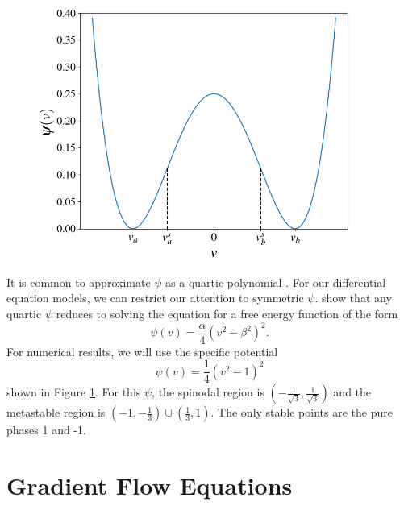 \documentclass[12pt, reqno]{report}
\theoremstyle{definition}
\theoremstyle{remark}
\begin{document}
\begin{figure}
    \centering
    \vspace{-15pt}
    \includegraphics[width=.4\paperwidth]{media_paper/our_well}
  \label{fg_double_well} 
\end{figure}
It is common to approximate $\psi$ as a quartic polynomial \cite{novickcohen_1984_nonlinear}.
For our differential equation models, we can restrict our attention to symmetric $\psi$. 
\cite{copetti_1990_kinetics} show that any quartic $\psi$ reduces to solving the equation for a free energy function of the form
\begin{equation} \label{eq_gen_psi}
    \psi(v )=\frac{\alpha}{4}(v^2-\beta^2)^2.
\end{equation}
For numerical results, we will use the specific potential
\begin{equation} \label{eq_double_well}
    \psi(v )=\frac{1}{4}(v^2-1)^2
\end{equation}
shown in Figure \ref{fg_double_well}. 
For this $\psi$, the spinodal region is $(-\frac{1}{\sqrt{3}},\frac{1}{\sqrt{3}})$ and the metastable region is $(-1,-\frac{1}{3})\cup(\frac{1}{3},1)$. 
The only stable points are the pure phases 1 and -1.


\section{Gradient Flow Equations} \label{sec_func}
\end{document}
